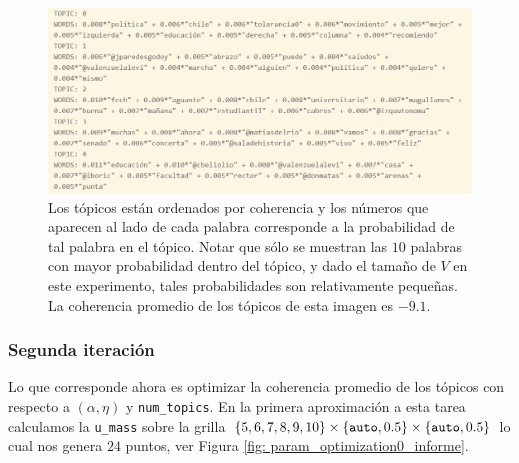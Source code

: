 \documentclass{article}
\begin{document}
	\begin{figure}[H]
		\centering
		\includegraphics[scale=.32]{../imgs/boric0_informe.png}
		\caption{Los tópicos están ordenados por coherencia y los números que aparecen al lado de cada palabra corresponde a la probabilidad de tal palabra en el tópico. Notar que sólo se muestran las $10$ palabras con mayor probabilidad dentro del tópico, y dado el tamaño de $V$ en este experimento, tales probabilidades son relativamente pequeñas. La coherencia promedio de los tópicos de esta imagen es $-9.1$.}
		\label{fig: boric0_informe}
	\end{figure}

	\subsubsection{Segunda iteración}
	Lo que corresponde ahora es optimizar la coherencia promedio de los tópicos con respecto a $(\alpha, \eta)$ y \texttt{num\_topics}. En la primera aproximación a esta tarea calculamos la \texttt{u\_mass} sobre la grilla $\left\{5,6,7,8,9,10\right\}\times\left\{\texttt{auto}, 0.5\right\}\times\left\{\texttt{auto}, 0.5\right\}$ lo cual nos genera $24$ puntos, ver Figura \ref{fig: param_optimization0_informe}.
	
	
	
\end{document}
